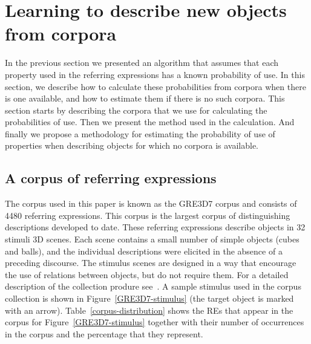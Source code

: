 \section{Learning to describe new objects from corpora}
\label{sec:learning}

In the previous section we presented an algorithm that assumes that each property used in the referring expressions has a known probability of use. In this section, we describe how to calculate these probabilities from corpora when there is one available, and how to estimate them if there is no such corpora. This section starts by describing the corpora that we use for calculating the probabilities of use. Then we present the method used in the calculation. And finally we propose a methodology for estimating the probability of use of properties when describing objects for which no corpora is available. 

\subsection{A corpus of referring expressions}

The corpus used in this paper is known as the GRE3D7 corpus and consists of 4480 referring expressions. This corpus is the largest corpus of distinguishing descriptions developed to date. These referring expressions describe objects in 32 stimuli 3D scenes. Each scene contains a small number of simple objects (cubes and balls), and the individual descriptions were elicited in the absence of a preceding discourse. The stimulus scenes are designed in a way that encourage the use of relations between objects, but do not require them. For a detailed description of the collection produre see~\cite[Chapter 5]{viet:gene11}. A sample stimulus used in the corpus collection is shown in Figure~\ref{GRE3D7-stimulus} (the target object is marked with an arrow). Table~\ref{corpus-distribution} shows the REs that appear in the corpus for Figure~\ref{GRE3D7-stimulus} together with their number of occurrences in the corpus and the percentage that they represent.  

